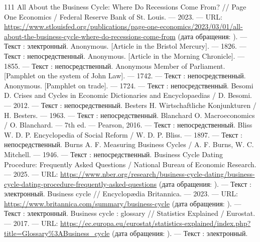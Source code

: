 \begin{RaggedRight}
\begin{thebibliography}{111}
     \hypertarget{bib:FRED-2023}{} All About the Business Cycle: Where Do Recessions Come From? // Page One Economics / Federal Reserve Bank of St. Louis. --- 2023. --- URL: \url{https://www.stlouisfed.org/publications/page-one-economics/2023/03/01/all-about-the-business-cycle-where-do-recessions-come-from} (дата обращения: \bibaccessdate). --- Текст : электронный.
     \hypertarget{bib:Anonymous-1826}{} Anonymous. [Article in the Bristol Mercury]. --- 1826. --- Текст : непосредственный.
     \hypertarget{bib:Anonymous-1855}{} Anonymous. [Article in the Morning Chronicle]. --- 1855. --- Текст : непосредственный.
     \hypertarget{bib:Anonymous-1742}{} Anonymous Member of Parliament. [Pamphlet on the system of John Law]. --- 1742. --- Текст : непосредственный.
     \hypertarget{bib:Anonymous-1724}{} Anonymous. [Pamphlet on trade]. --- 1724. --- Текст : непосредственный.
     \hypertarget{bib:Besomi-2012}{} Besomi D. Crises and Cycles in Economic Dictionaries and Encyclopaedias / D. Besomi. --- 2012. --- Текст : непосредственный.
     \hypertarget{bib:Besters-1963}{} Besters H. Wirtschaftliche Konjunkturen / H. Besters. --- 1963. --- Текст : непосредственный.
     \hypertarget{bib:Blanchard-2016}{} Blanchard O. Macroeconomics / O. Blanchard. --- 7th ed. --- Pearson, 2016. --- Текст : непосредственный.
     \hypertarget{bib:Bliss-1897}{} Bliss W. D. P. Encyclopedia of Social Reform / W. D. P. Bliss. --- 1897. --- Текст : непосредственный.
     \hypertarget{bib:Burns-1946}{} Burns A. F. Measuring Business Cycles / A. F. Burns, W. C. Mitchell. --- 1946. --- Текст : непосредственный.
     \hypertarget{bib:NBER-2025}{} Business Cycle Dating Procedure: Frequently Asked Questions / National Bureau of Economic Research. --- 2025. --- URL: \url{https://www.nber.org/research/business-cycle-dating/business-cycle-dating-procedure-frequently-asked-questions} (дата обращения: \bibaccessdate). --- Текст : электронный.
     \hypertarget{bib:Britannica-2023}{} Business cycle // Encyclopædia Britannica. --- 2023. --- URL: \url{https://www.britannica.com/summary/business-cycle} (дата обращения: \bibaccessdate). --- Текст : электронный.
     \hypertarget{bib:Eurostat-2017}{} Business cycle : glossary // Statistics Explained / Eurostat. --- 2017. --- URL: \url{https://ec.europa.eu/eurostat/statistics-explained/index.php?title=Glossary%3ABusiness_cycle} (дата обращения: \bibaccessdate). --- Текст : электронный.

\end{thebibliography}
\end{RaggedRight}
